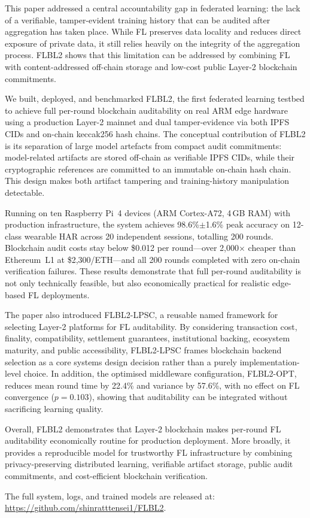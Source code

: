 \documentclass{llncs}
\begin{document}
This paper addressed a central accountability gap in federated learning: the lack of a verifiable, tamper-evident training history that can be audited after aggregation has taken place. While FL preserves data locality and reduces direct exposure of private data, it still relies heavily on the integrity of the aggregation process. FLBL2 shows that this limitation can be addressed by combining FL with content-addressed off-chain storage and low-cost public Layer-2 blockchain commitments.

We built, deployed, and benchmarked FLBL2, the first federated learning testbed to achieve full per-round blockchain auditability on real ARM edge hardware using a production Layer-2 mainnet and dual tamper-evidence via both IPFS CIDs and on-chain keccak256 hash chains. The conceptual contribution of FLBL2 is its separation of large model artefacts from compact audit commitments: model-related artifacts are stored off-chain as verifiable IPFS CIDs, while their cryptographic references are committed to an immutable on-chain hash chain. This design makes both artifact tampering and training-history manipulation detectable.

Running on ten Raspberry Pi~4 devices (ARM Cortex-A72, 4\,GB RAM) with production infrastructure, the system achieves 98.6\%$\pm$1.6\% peak accuracy on 12-class wearable HAR across 20 independent sessions, totalling 200 rounds. Blockchain audit costs stay below \$0.012 per round---over 2{,}000$\times$ cheaper than Ethereum~L1 at \$2{,}300/ETH---and all 200 rounds completed with zero on-chain verification failures. These results demonstrate that full per-round auditability is not only technically feasible, but also economically practical for realistic edge-based FL deployments.

The paper also introduced FLBL2-LPSC, a reusable named framework for selecting Layer-2 platforms for FL auditability. By considering transaction cost, finality, compatibility, settlement guarantees, institutional backing, ecosystem maturity, and public accessibility, FLBL2-LPSC frames blockchain backend selection as a core systems design decision rather than a purely implementation-level choice. In addition, the optimised middleware configuration, FLBL2-OPT, reduces mean round time by 22.4\% and variance by 57.6\%, with no effect on FL convergence ($p=0.103$), showing that auditability can be integrated without sacrificing learning quality.

Overall, FLBL2 demonstrates that Layer-2 blockchain makes per-round FL auditability economically routine for production deployment. More broadly, it provides a reproducible model for trustworthy FL infrastructure by combining privacy-preserving distributed learning, verifiable artifact storage, public audit commitments, and cost-efficient blockchain verification.

The full system, logs, and trained models are released at:
\url{https://github.com/shinratttensei1/FLBL2}.



\end{document}
